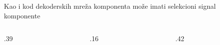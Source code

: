 \begin{frame}[label=03-s015]
\gusttekst
Kao i kod dekoderskih mreža komponenta može imati selekcioni signal komponente
\begingroup
\def\DEoznsize{8}\def\DEoblik{.6}\def\DEdekmod{1}\def\DEcs{1}\def\DEprimer{0}\def\DEjedinica{.75cm}
\begin{columns}[c,onlytextwidth]
\begin{column}{.39\textwidth}\centering

\end{column}
\begin{column}{.16\textwidth}\centering
\par
{}
\end{column}
\begin{column}{.42\textwidth}\centering

\end{column}
\end{columns}
\endgroup
\end{frame}
